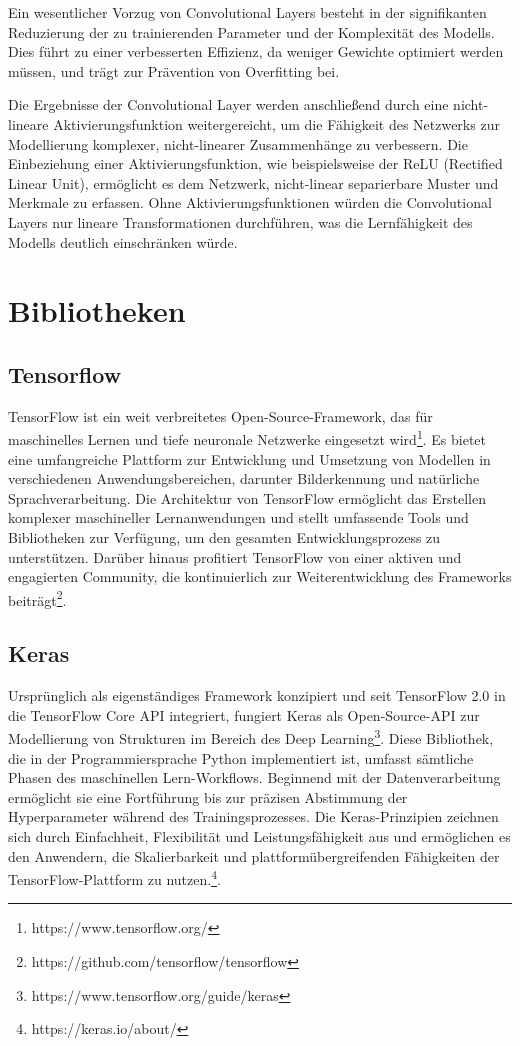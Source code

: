 Ein wesentlicher Vorzug von Convolutional Layers besteht in der signifikanten Reduzierung der zu trainierenden Parameter und der Komplexität des Modells. Dies führt zu einer verbesserten Effizienz, da weniger Gewichte optimiert werden müssen, und trägt zur Prävention von Overfitting bei\cite{Yamashita.2018,OShea.2015}.

Die Ergebnisse der Convolutional Layer werden anschließend durch eine nicht-lineare Aktivierungsfunktion weitergereicht, um die Fähigkeit des Netzwerks zur Modellierung komplexer, nicht-linearer Zusammenhänge zu verbessern. Die Einbeziehung einer Aktivierungsfunktion, wie beispielsweise der ReLU (Rectified Linear Unit), ermöglicht es dem Netzwerk, nicht-linear separierbare Muster und Merkmale zu erfassen. Ohne Aktivierungsfunktionen würden die Convolutional Layers nur lineare Transformationen durchführen, was die Lernfähigkeit des Modells deutlich einschränken würde\cite{Sharma.2017}.

\section{Bibliotheken}
\subsection{Tensorflow}
TensorFlow ist ein weit verbreitetes Open-Source-Framework, das für maschinelles Lernen und tiefe neuronale Netzwerke eingesetzt wird\footnote{https://www.tensorflow.org/}. Es bietet eine umfangreiche Plattform zur Entwicklung und Umsetzung von Modellen in verschiedenen Anwendungsbereichen, darunter Bilderkennung und natürliche Sprachverarbeitung. Die Architektur von TensorFlow ermöglicht das Erstellen komplexer maschineller Lernanwendungen und stellt umfassende Tools und Bibliotheken zur Verfügung, um den gesamten Entwicklungsprozess zu unterstützen. Darüber hinaus profitiert TensorFlow von einer aktiven und engagierten Community, die kontinuierlich zur Weiterentwicklung des Frameworks beiträgt\footnote{https://github.com/tensorflow/tensorflow}.

\subsection{Keras}
Ursprünglich als eigenständiges Framework konzipiert und seit TensorFlow 2.0 in die TensorFlow Core API integriert, fungiert Keras als Open-Source-API zur Modellierung von Strukturen im Bereich des Deep Learning\footnote{https://www.tensorflow.org/guide/keras}. Diese Bibliothek, die in der Programmiersprache Python implementiert ist, umfasst sämtliche Phasen des maschinellen Lern-Workflows. Beginnend mit der Datenverarbeitung ermöglicht sie eine Fortführung bis zur präzisen Abstimmung der Hyperparameter während des Trainingsprozesses. Die Keras-Prinzipien zeichnen sich durch Einfachheit, Flexibilität und Leistungsfähigkeit aus und ermöglichen es den Anwendern, die Skalierbarkeit und plattformübergreifenden Fähigkeiten der TensorFlow-Plattform zu nutzen.\footnote{https://keras.io/about/}.